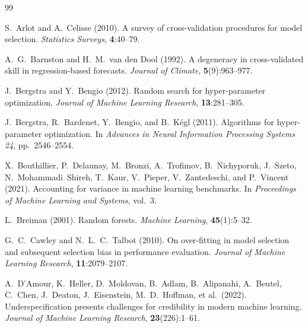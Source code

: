 \documentclass[twoside]{article}
\begin{document}

\begin{thebibliography}{99}
\setlength{\itemindent}{-\leftmargin}
\makeatletter\renewcommand{\@biblabel}[1]{}\makeatother

S.~Arlot and A.~Celisse (2010).
\newblock A survey of cross-validation procedures for model selection.
\newblock \textit{Statistics Surveys}, \textbf{4}:40--79.

A.~G.~Barnston and H.~M.~van den Dool (1992).
\newblock A degeneracy in cross-validated skill in regression-based
  forecasts.
\newblock \textit{Journal of Climate}, \textbf{5}(9):963--977.

J.~Bergstra and Y.~Bengio (2012).
\newblock Random search for hyper-parameter optimization.
\newblock \textit{Journal of Machine Learning Research}, \textbf{13}:281--305.

J.~Bergstra, R.~Bardenet, Y.~Bengio, and B.~K{\'e}gl (2011).
\newblock Algorithms for hyper-parameter optimization.
\newblock In \textit{Advances in Neural Information Processing Systems 24},
  pp.~2546--2554.

X.~Bouthillier, P.~Delaunay, M.~Bronzi, A.~Trofimov, B.~Nichyporuk,
  J.~Szeto, N.~Mohammadi~Shireh, T.~Kaur, V.~Pieper, V.~Zantedeschi,
  and P.~Vincent (2021).
\newblock Accounting for variance in machine learning benchmarks.
\newblock In \textit{Proceedings of Machine Learning and Systems}, vol.~3.

L.~Breiman (2001).
\newblock Random forests.
\newblock \textit{Machine Learning}, \textbf{45}(1):5--32.

G.~C.~Cawley and N.~L.~C.~Talbot (2010).
\newblock On over-fitting in model selection and subsequent selection bias in
  performance evaluation.
\newblock \textit{Journal of Machine Learning Research}, \textbf{11}:2079--2107.

A.~D'Amour, K.~Heller, D.~Moldovan, B.~Adlam, B.~Alipanahi, A.~Beutel,
  C.~Chen, J.~Deaton, J.~Eisenstein, M.~D.~Hoffman, et al.\ (2022).
\newblock Underspecification presents challenges for credibility in modern
  machine learning.
\newblock \textit{Journal of Machine Learning Research}, \textbf{23}(226):1--61.


\end{thebibliography}
\end{document}
